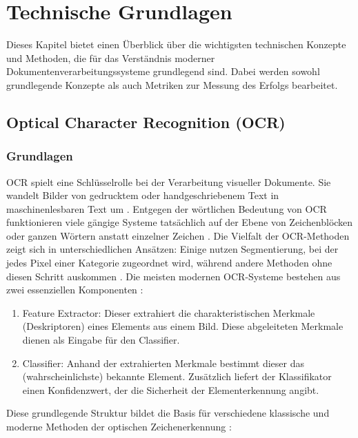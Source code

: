 \chapter{Technische Grundlagen}
\label{cha:technische-grundlagen}

Dieses Kapitel bietet einen Überblick über die wichtigsten technischen Konzepte und Methoden, die für das Verständnis moderner Dokumentenverarbeitungssysteme grundlegend sind. Dabei werden sowohl grundlegende Konzepte als auch Metriken zur Messung des Erfolgs bearbeitet. 

\section{Optical Character Recognition (OCR)}
\label{sec:optical-character-recognition-ocr}

\subsection{Grundlagen}
\label{subsec:grundlagen-ocr}

\gls{OCR} spielt eine Schlüsselrolle bei der Verarbeitung visueller Dokumente. 
Sie wandelt Bilder von gedrucktem oder handgeschriebenem Text in maschinenlesbaren Text um \parencite{MoriS.1992HroO}.
Entgegen der wörtlichen Bedeutung von \acrfull{OCR} funktionieren viele gängige Systeme tatsächlich auf der Ebene von Zeichenblöcken oder ganzen Wörtern anstatt einzelner Zeichen \parencite{BorovikovEugene2014Asom}.
Die Vielfalt der \gls{OCR}-Methoden zeigt sich in unterschiedlichen Ansätzen: Einige nutzen Segmentierung, bei der jedes Pixel einer Kategorie zugeordnet wird, während andere Methoden ohne diesen Schritt auskommen \parencite{BorovikovEugene2014Asom}. 
Die meisten modernen \gls{OCR}-Systeme bestehen aus zwei essenziellen Komponenten \parencite{BorovikovEugene2014Asom}:

\begin{enumerate}
	\item Feature Extractor: Dieser extrahiert die charakteristischen Merkmale (Deskriptoren) eines Elements aus einem Bild. Diese abgeleiteten Merkmale dienen als Eingabe für den Classifier.
	\item Classifier: Anhand der extrahierten Merkmale bestimmt dieser das (wahrscheinlichste) bekannte Element. Zusätzlich liefert der Klassifikator einen Konfidenzwert, der die Sicherheit der Elementerkennung angibt.
\end{enumerate}

Diese grundlegende Struktur bildet die Basis für verschiedene klassische und moderne Methoden der optischen Zeichenerkennung \parencite{BorovikovEugene2014Asom}:

